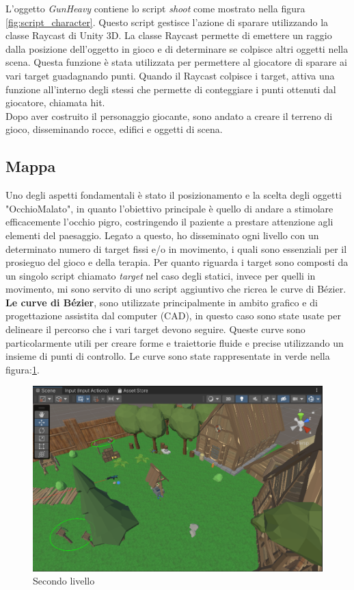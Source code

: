 \documentclass[
a4paper,
cleardoublepage=empty,
headings=twolinechapter,
numbers=autoenddot,
]{scrbook}
\begin{document}
	L'oggetto \textit{GunHeavy} contiene lo script \textit{shoot} come mostrato nella figura \ref{fig:script_character}. Questo script gestisce l'azione di sparare utilizzando la classe Raycast di Unity 3D. La classe Raycast permette di emettere un raggio dalla posizione dell'oggetto in gioco e di determinare se colpisce altri oggetti nella scena. Questa funzione è stata utilizzata per permettere al giocatore di sparare ai vari target guadagnando punti.
	Quando il Raycast colpisce i target, attiva una funzione all'interno degli stessi che permette di conteggiare i punti ottenuti dal giocatore, chiamata hit.\\
	Dopo aver costruito il personaggio giocante, sono andato a creare il terreno di gioco, disseminando rocce, edifici e oggetti di scena.
	\subsection{Mappa}
	Uno degli aspetti fondamentali è stato il posizionamento e la scelta degli oggetti "OcchioMalato", in quanto l'obiettivo principale è quello di andare a stimolare efficacemente l'occhio pigro, costringendo il paziente a prestare attenzione agli elementi del paesaggio.
	Legato a questo, ho disseminato ogni livello con un determinato numero di target fissi e/o in movimento, i quali sono essenziali per il prosieguo del gioco e della terapia.
	Per quanto riguarda i target sono composti da un singolo script chiamato \textit{target} nel caso degli statici, invece per quelli in movimento, mi sono servito di uno script aggiuntivo che ricrea le curve di Bézier\cite{Pack_asset}.
	\textbf{Le curve di Bézier}\cite{Path_asset}, sono utilizzate principalmente in ambito grafico e di progettazione assistita dal computer (CAD), in questo caso sono state usate per delineare il percorso che i vari target devono seguire. Queste curve sono particolarmente utili per creare forme e traiettorie fluide e precise utilizzando un insieme di punti di controllo.
	Le curve sono state rappresentate in verde nella figura:\ref{fig:mappa}.
	\begin{figure}[H]
		\centering
		\includegraphics[width=0.6\linewidth]{image/mappa}
		\caption{Secondo livello}
		\label{fig:mappa}
	\end{figure}
\end{document}
